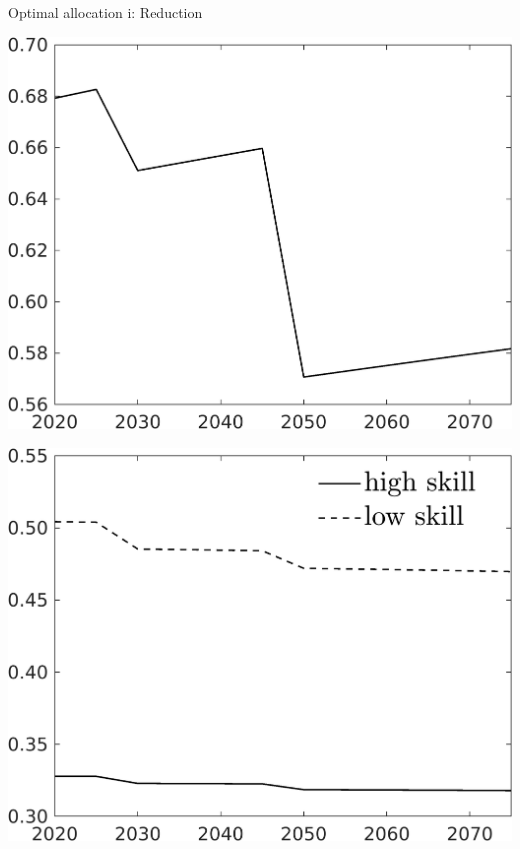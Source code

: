 \documentclass[11pt,aspectratio=169]{beamer}
\begin{document}
\begin{frame}{Optimal allocation i: Reduction}
	\hypertarget{alloc}{}
	\vspace{-2mm}
	\centering
	\begin{minipage}[]{0.32\textwidth}
		\includegraphics[width=1\textwidth]{../codding_model/own_basedOnFried/optimalPol_elastS_DisuSci/figures/all_1705/Single_OPT_T_NoTaus_C_spillover0_sep1_BN0_ineq0_red0_etaa0.79.png}
	\end{minipage}
	\begin{minipage}[]{0.32\textwidth}
		\includegraphics[width=1\textwidth]{../codding_model/own_basedOnFried/optimalPol_elastS_DisuSci/figures/all_1705/SingleJoint_OPT_T_NoTaus_labour_spillover0_sep1_BN0_ineq0_red0_etaa0.79_lgd1.png}

\end{minipage}
\end{frame}
\end{document}

